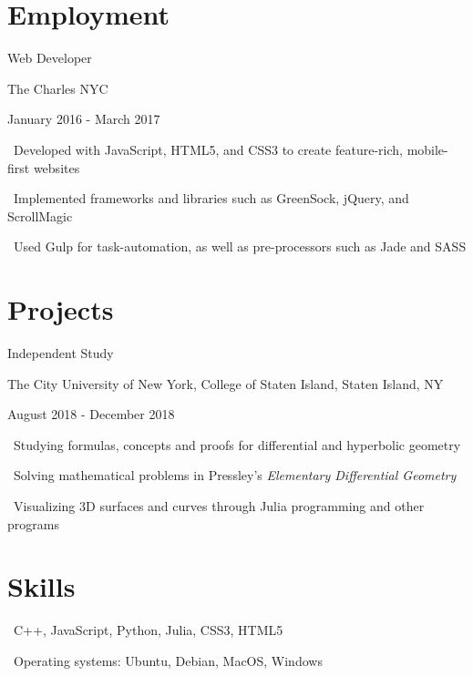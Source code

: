 \documentclass[letterpaper]{article}
\renewenvironment{itemize}{
  \begin{list}{}{
    \setlength{\leftmargin}{1.5em}
  }
}{
  \end{list}
}
\begin{document}
\section*{Employment}

\begin{itemize}
\item Web Developer

The Charles NYC

January 2016 - March 2017
  \begin{itemize}
    \item \textperiodcentered \ Developed with JavaScript, HTML5, and CSS3 to create feature-rich, mobile-first websites
    \item \textperiodcentered \ Implemented frameworks and libraries such as GreenSock, jQuery, and ScrollMagic
    \item \textperiodcentered \ Used Gulp for task-automation, as well as pre-processors such as Jade and SASS
  \end{itemize}
\end{itemize}

\section*{Projects}

\begin{itemize}
  \item Independent Study
  
  The City University of New York, College of Staten Island, Staten Island, NY
  
  August 2018 - December 2018

  \begin{itemize}
    \item \textperiodcentered \ Studying formulas, concepts and proofs for differential and hyperbolic geometry
    \item \textperiodcentered \ Solving mathematical problems in Pressley's \emph{Elementary Differential Geometry}
    \item \textperiodcentered \ Visualizing 3D surfaces and curves through Julia programming and other programs
  \end{itemize}
\end{itemize}

\section*{Skills}
\begin{itemize}
  \item \textperiodcentered \ C++, JavaScript, Python, Julia, CSS3, HTML5
  \item \textperiodcentered \ Operating systems: Ubuntu, Debian, MacOS, Windows
\end{itemize}

\bigskip
\end{document}
